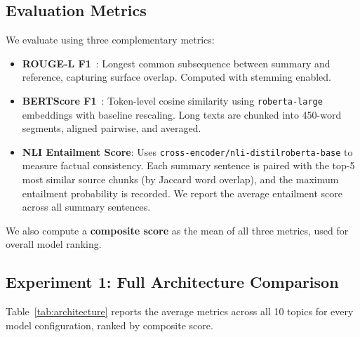 \subsection{Evaluation Metrics}

We evaluate using three complementary metrics:
\begin{itemize}
    \item \textbf{ROUGE-L F1}~\citep{lin2004rouge}: Longest common subsequence between summary and reference, capturing surface overlap. Computed with stemming enabled.
    \item \textbf{BERTScore F1}~\citep{zhang2020bertscore}: Token-level cosine similarity using \texttt{roberta-large} embeddings with baseline rescaling. Long texts are chunked into 450-word segments, aligned pairwise, and averaged.
    \item \textbf{NLI Entailment Score}: Uses \texttt{cross-encoder/nli-distilroberta-base} to measure factual consistency. Each summary sentence is paired with the top-5 most similar source chunks (by Jaccard word overlap), and the maximum entailment probability is recorded. We report the average entailment score across all summary sentences.
\end{itemize}
We also compute a \textbf{composite score} as the mean of all three metrics, used for overall model ranking.

\subsection{Experiment 1: Full Architecture Comparison}

Table~\ref{tab:architecture} reports the average metrics across all 10 topics for every model configuration, ranked by composite score.

